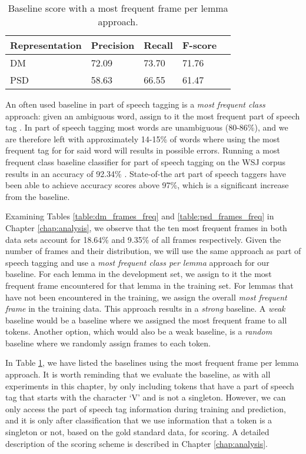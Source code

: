 \begin{table}
    \centering
    \smaller[0.2]
    \begin{tabular}{@{}lllll@{}}
        \toprule
        \textbf{Representation} & \textbf{Precision} & \textbf{Recall} & \textbf{F-score} \\
        \midrule
        DM & 72.09 & 73.70 & 71.76\\ 
        PSD & 58.63 & 66.55 & 61.47\\
        \bottomrule
    \end{tabular}
    \caption{Baseline score with a most frequent frame per lemma approach.}
    \label{table:baseline}
\end{table}

An often used baseline in part of speech tagging is a \textit{most frequent class} approach: given an ambiguous word, assign to it the most frequent part of speech tag \cite{Jur:Mar:09}. In part of speech tagging most words are unambiguous (80-86\%), and we are therefore left with approximately 14-15\% of words where using the most frequent tag for for said word will results in possible errors. Running a most frequent class baseline classifier for part of speech tagging on the WSJ corpus results in an accuracy of 92.34\% \cite{Jur:Mar:09}. State-of-the art part of speech taggers have been able to achieve accuracy scores above 97\%, which is a significant increase from the baseline.

Examining Tables \ref{table:dm_frames_freq} and \ref{table:psd_frames_freq} in Chapter \ref{chap:analysis}, we observe that the ten most frequent frames in both data sets account for 18.64\% and 9.35\% of all frames respectively. Given the number of frames and their distribution, we will use the same approach as part of speech tagging and use a \textit{most frequent class per lemma} approach for our baseline. For each lemma in the development set, we assign to it the most frequent frame encountered for that lemma in the training set. For lemmas that have not been encountered in the training, we assign the overall \textit{most frequent frame} in the training data. This approach results in a \textit{strong} baseline. A \textit{weak} baseline would be a baseline where we assigned the most frequent frame to all tokens. Another option, which would also be a weak baseline, is a \textit{random} baseline where we randomly assign frames to each token.

In Table \ref{table:baseline}, we have listed the baselines using the most frequent frame per lemma approach. It is worth reminding that we evaluate the baseline, as with all experiments in this chapter, by only including tokens that have a part of speech tag that starts with the character `V' and is not a singleton. However, we can only access the part of speech tag information during training and prediction, and it is only after classification that we use information that a token is a singleton or not, based on the gold standard data, for scoring. A detailed description of the scoring scheme is described in Chapter \ref{chap:analysis}.

